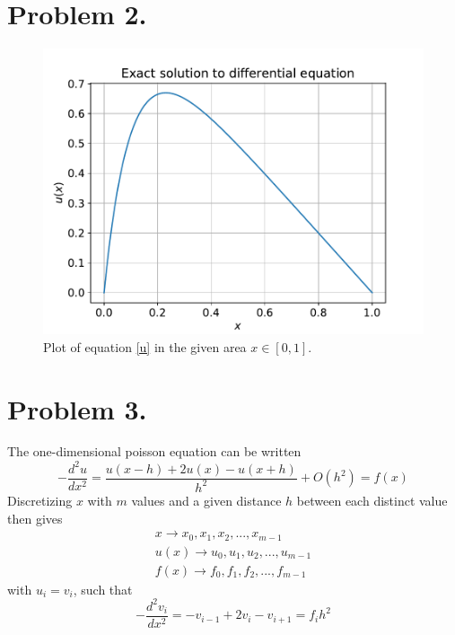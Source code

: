 \documentclass[english,notitlepage]{revtex4-1}  %
\begin{document}
\section*{Problem 2.}
    \label{sec:oppgave2}
    \begin{figure}[!ht]
        \centering
        \includegraphics[scale=0.7]{exact_solution.pdf}
        \caption{Plot of equation \ref{u} in the given area $x \in [0, 1]$.}
        \label{exact_plot}
    \end{figure}


\section*{Problem 3.}
    The one-dimensional poisson equation can be written
    \begin{equation*}
            -\frac{d ^2 u}{dx^2} 
        =   \frac{u(x-h)+2u(x)- u(x+h)}{h^2} + O(h^2)
        =   f(x)
    \end{equation*}
    Discretizing $x$ with $m$ values and a given distance $h$ between each distinct value then gives
    \begin{align*}
            x 
        \rightarrow 
            x_0, x_1, x_2, ..., x_{m - 1}\\
            u(x) 
        \rightarrow 
            u_0, u_1, u_2, ..., u_{m - 1}\\
            f(x) 
        \rightarrow 
            f_0, f_1 , f_2, ..., f_{m - 1}
    \end{align*}
    with $u_i = v_i$, such that
    \begin{equation*}
            -\frac{d^2 v_i}{dx^2} 
        =   -v_{i-1} + 2v_i - v_{i+1} 
        =   f_ih^2
    \end{equation*}
\end{document}
